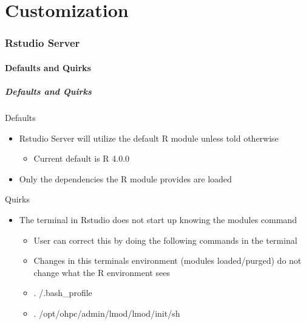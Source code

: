 \part{Customization}
\begin{frame}
			 \partpage
\end{frame}


\section[Rstudio]{Rstudio Server}
\subsection[rstudiodef]{Defaults and Quirks}
\begin{frame}
  \frametitle{Defaults and Quirks}
	\begin{block}{Defaults}
		\begin{itemize}
			\item Rstudio Server will utilize the default R module unless told otherwise
				\begin{itemize}
					\item Current default is R 4.0.0
				\end{itemize}
			\item Only the dependencies the R module provides are loaded
		\end{itemize}
	\end{block}
	\begin{block}{Quirks}
			\begin{itemize}
			\item The terminal in Rstudio does not start up knowing the modules command
			\begin{itemize}
			\item User can correct this by doing the following commands in the terminal
			\item Changes in this terminals environment (modules loaded/purged) do not change what the R environment sees
			\item . \ctilde{}/.bash\_profile
			\item . /opt/ohpc/admin/lmod/lmod/init/sh
			\end{itemize}
		\end{itemize}
	\end{block}
\end{frame}


